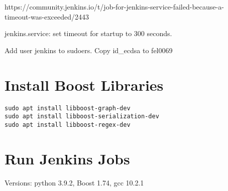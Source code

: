 \documentclass[12pt,a4paper]{report}
\begin{document}
https://community.jenkins.io/t/job-for-jenkins-service-failed-because-a-\\ timeout-was-exceeded/2443

jenkins.service: set timeout for startup to 300 seconds.

Add user jenkins to sudoers.
Copy id\_ecdsa to fel0069
\chapter{Install Boost Libraries}
\begin{verbatim}
sudo apt install libboost-graph-dev
sudo apt install libboost-serialization-dev
sudo apt install libboost-regex-dev
\end{verbatim}
\chapter{Run Jenkins Jobs}
Versions: python 3.9.2, Boost 1.74, gcc 10.2.1
\end{document}

